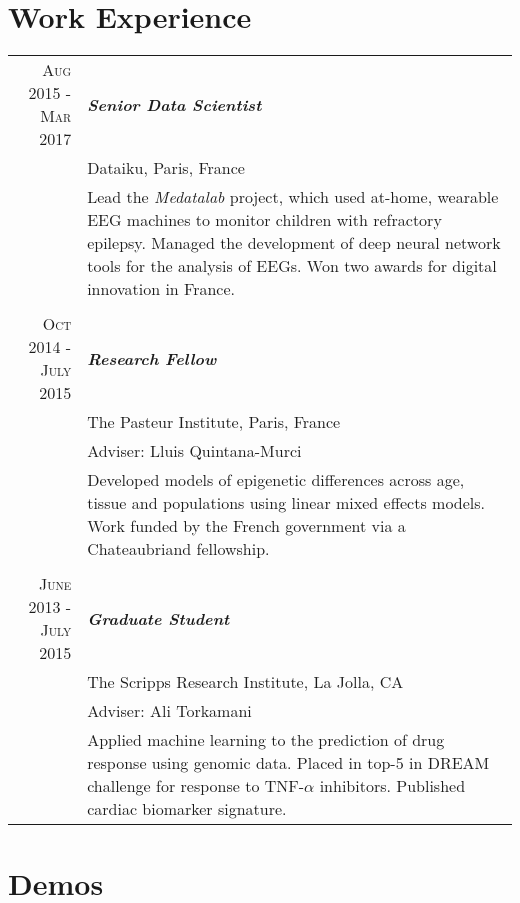\documentclass{article}
\begin{document}
\section{Work Experience}
\begin{tabular}{r | p{11cm}}

 \raggedleft \textsc{Aug} 2015 - \textsc{Mar} 2017 & \emph{\textbf{Senior Data Scientist}} \\
   & Dataiku, Paris, France\\
 &\footnotesize{Lead the \emph{Medatalab} project, which used at-home, wearable EEG machines to monitor children with refractory epilepsy. Managed the development of deep neural network tools for the analysis of EEGs. Won two awards for digital innovation in France.} \\
 
 \multicolumn{2}{c}{} \\
 
\raggedleft \textsc{Oct} 2014 - \textsc{July} 2015 & \emph{\textbf{Research Fellow}} \\
   & The Pasteur Institute, Paris, France\\
   & Adviser: Lluis Quintana-Murci\\
 &\footnotesize{Developed models of epigenetic differences across age, tissue and populations using linear mixed effects models. Work funded by the French government via a Chateaubriand fellowship.} \\
 
  \multicolumn{2}{c}{} \\
 
\raggedleft \textsc{June} 2013 - \textsc{July} 2015 & \emph{\textbf{Graduate Student}} \\
   & The Scripps Research Institute, La Jolla, CA\\
   & Adviser: Ali Torkamani\\
 &\footnotesize{Applied machine learning to the prediction of drug response using genomic data. Placed in top-5 in DREAM challenge for response to TNF-$\alpha$ inhibitors. Published cardiac biomarker signature.} \\

\end{tabular}


\section{Demos}
\end{document}
